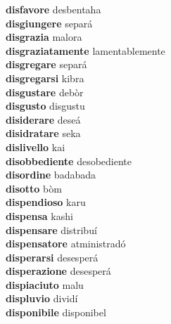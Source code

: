 \textbf{disfavore } desbentaha \\
\textbf{disgiungere } separá \\
\textbf{disgrazia } malora \\
\textbf{disgraziatamente } lamentablemente \\
\textbf{disgregare } separá \\
\textbf{disgregarsi } kibra \\
\textbf{disgustare } debòr \\
\textbf{disgusto } disgustu \\
\textbf{disiderare } deseá \\
\textbf{disidratare } seka \\
\textbf{dislivello } kai \\
\textbf{disobbediente } desobediente \\
\textbf{disordine } badabada \\
\textbf{disotto } bòm \\
\textbf{dispendioso } karu \\
\textbf{dispensa } kashi \\
\textbf{dispensare } distribuí \\
\textbf{dispensatore } atministradó \\
\textbf{disperarsi } desesperá \\
\textbf{disperazione } desesperá \\
\textbf{dispiaciuto } malu \\
\textbf{displuvio } dividí \\
\textbf{disponibile } disponibel \\
